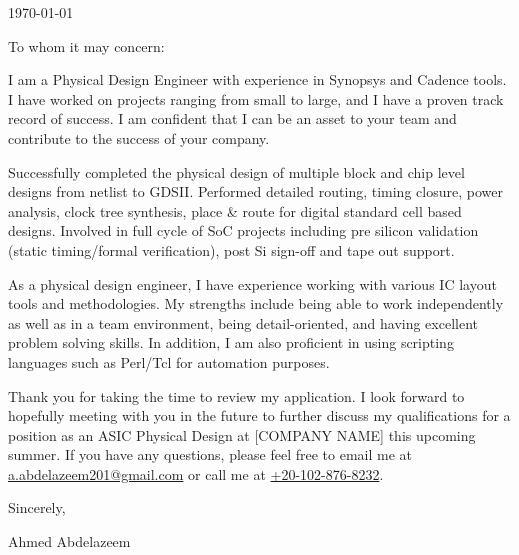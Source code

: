 \documentclass{ExpressiveCoverLetter}
\begin{document}
	
	\coverletterheader[
	firstname=Ahmed,
	lastname=Abdelazeem,
	email=a.abdelazeem201@gmail.com,
	phone=(+20) 102-876-8232,
	linkedin=ahmed-abdelazeem,
	github=abdelazeem201,
	]
	
	\vspace{0.25in}
	\today
	\vspace{0.15in}
	
	
	To whom it may concern:

I am a Physical Design Engineer with experience in Synopsys and Cadence tools. I have worked on projects ranging from small to large, and I have a proven track record of success. I am confident that I can be an asset to your team and contribute to the success of your company.

Successfully completed the physical design of multiple block and chip level designs from netlist to GDSII. Performed detailed routing, timing closure, power analysis, clock tree synthesis, place \& route for digital standard cell based designs. Involved in full cycle of SoC projects including pre silicon validation (static timing/formal verification), post Si sign-off and tape out support.

As a physical design engineer, I have experience working with various IC layout tools and methodologies. My strengths include being able to work independently as well as in a team environment, being detail-oriented, and having excellent problem solving skills. In addition, I am also proficient in using scripting languages such as Perl/Tcl for automation purposes.

	
	Thank you for taking the time to review my application. I look forward
	to hopefully meeting with you in the future to further discuss my
	qualifications for a position as an ASIC Physical Design at [COMPANY NAME]
	this upcoming summer. If you have any questions, please feel free to
	email me at \href{mailto:a.abdelazeem201@gmail.com}{a.abdelazeem201@gmail.com} or
	call me at \href{tel:+20-102-876-8232}{+20-102-876-8232}.
	
	Sincerely,
	
	\vspace{.1in}
	
	Ahmed Abdelazeem
	
\end{document}
